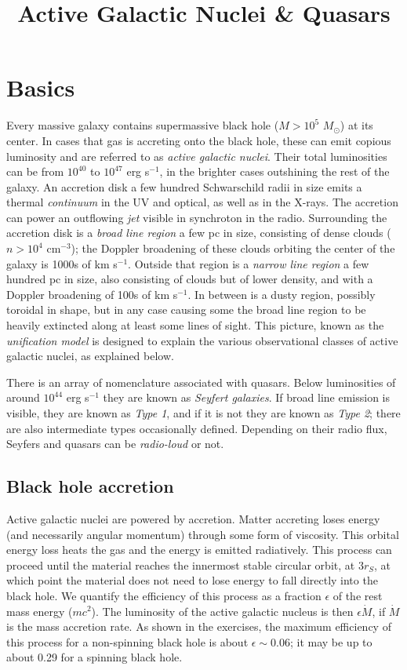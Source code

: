 \title{\bf Active Galactic Nuclei \& Quasars}

\section{Basics}

Every massive galaxy contains supermassive black hole ($M> 10^5$
$M_\odot$) at its center. In cases that gas is accreting onto the
black hole, these can emit copious luminosity and are referred to as
{\it active galactic nuclei}. Their total luminosities can be from
$10^{40}$ to $10^{47}$ erg s$^{-1}$, in the brighter cases outshining
the rest of the galaxy. An accretion disk a few hundred Schwarschild
radii in size emits a thermal {\it continuum} in the UV and optical,
as well as in the X-rays. The accretion can power an outflowing {\it
  jet} visible in synchroton in the radio. Surrounding the accretion
disk is a {\it broad line region} a few pc in size, consisting of
dense clouds ($n>10^4$ cm$^{-3}$); the Doppler broadening of these
clouds orbiting the center of the galaxy is 1000s of km
s$^{-1}$. Outside that region is a {\it narrow line region} a few
hundred pc in size, also consisting of clouds but of lower density,
and with a Doppler broadening of 100s of km s$^{-1}$. In between is a
dusty region, possibly toroidal in shape, but in any case causing some
the broad line region to be heavily extincted along at least some
lines of sight. This picture, known as the {\it unification model} is
designed to explain the various observational classes of active
galactic nuclei, as explained below.

There is an array of nomenclature associated with quasars. Below
luminosities of around $10^{44}$ erg s$^{-1}$ they are known as {\it
  Seyfert galaxies}. If broad line emission is visible, they are known
as {\it Type 1}, and if it is not they are known as {\it Type 2};
there are also intermediate types occasionally defined. Depending on
their radio flux, Seyfers and quasars can be {\it radio-loud} or not.

\subsection{Black hole accretion}

Active galactic nuclei are powered by accretion. Matter accreting
loses energy (and necessarily angular momentum) through some form of
viscosity. This orbital energy loss heats the gas and the energy is
emitted radiatively. This process can proceed until the material
reaches the innermost stable circular orbit, at $3r_S$, at which point
the material does not need to lose energy to fall directly into the
black hole. We quantify the efficiency of this process as a fraction
$\epsilon$ of the rest mass energy ($mc^2$). The luminosity of the
active galactic nucleus is then $\epsilon \dot M$, if $\dot M$ is the
mass accretion rate. As shown in the exercises, the maximum efficiency
of this process for a non-spinning black hole is about $\epsilon \sim
0.06$; it may be up to about 0.29 for a spinning black hole.

